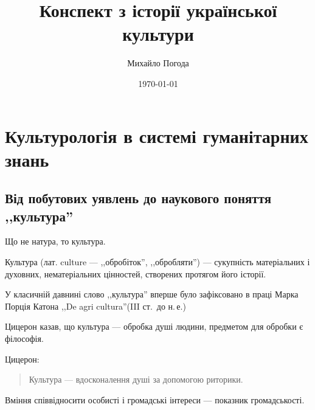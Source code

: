 \documentclass[a5paper,10pt,titlepage,pdftex,headsepline]{scrartcl}
\author{Михайло Погода}
\title{Конспект з історії української культури}
\date{\today}
\begin{document}
\maketitle
\newpage
\tableofcontents
\newpage

\section{Культурологія в системі гуманітарних знань}
\subsection{Від побутових уявлень до наукового поняття ,,культура''}
Що не натура, то культура.

Культура (лат. culture --- ,,обробіток'', ,,обробляти'') --- сукупність матеріальних і духовних, нематеріальних цінностей, створених протягом його історії.

У класичній давнині слово ,,культура'' вперше було зафіксовано в праці Марка Порція Катона ,,De agri cultura''(III ст.~до н.\,е.)

Цицерон казав, що культура --- обробка душі  людини, предметом для обробки є філософія.

Цицерон:
\begin{quote}
  Культура --- вдосконалення душі за допомогою риторики.
\end{quote}

Вміння співвідносити особисті і громадські інтереси --- показник громадськості.
\end{document}
